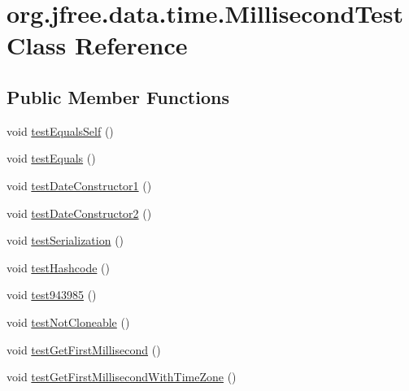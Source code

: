 \hypertarget{classorg_1_1jfree_1_1data_1_1time_1_1_millisecond_test}{}\section{org.\+jfree.\+data.\+time.\+Millisecond\+Test Class Reference}
\label{classorg_1_1jfree_1_1data_1_1time_1_1_millisecond_test}
\subsection*{Public Member Functions}
\begin{DoxyCompactItemize}
\item 
void \mbox{\hyperlink{classorg_1_1jfree_1_1data_1_1time_1_1_millisecond_test_a50713484e4d0f9be25ddb7e6b3e41e4f}{test\+Equals\+Self}} ()
\item 
void \mbox{\hyperlink{classorg_1_1jfree_1_1data_1_1time_1_1_millisecond_test_aeff51a4a9bc0872c56f6621bd3c331b6}{test\+Equals}} ()
\item 
void \mbox{\hyperlink{classorg_1_1jfree_1_1data_1_1time_1_1_millisecond_test_a9d6bd2d8d1970973ecf0a51f7749584a}{test\+Date\+Constructor1}} ()
\item 
void \mbox{\hyperlink{classorg_1_1jfree_1_1data_1_1time_1_1_millisecond_test_af014f7972606608f61926467a07a73cb}{test\+Date\+Constructor2}} ()
\item 
void \mbox{\hyperlink{classorg_1_1jfree_1_1data_1_1time_1_1_millisecond_test_ac260bba0fa2fb5bbe687b30ee4f79dc8}{test\+Serialization}} ()
\item 
void \mbox{\hyperlink{classorg_1_1jfree_1_1data_1_1time_1_1_millisecond_test_a27a0b5c04e4618efb087138b33d3080d}{test\+Hashcode}} ()
\item 
void \mbox{\hyperlink{classorg_1_1jfree_1_1data_1_1time_1_1_millisecond_test_a06791ca82d25dad7b89259387ed7ba94}{test943985}} ()
\item 
void \mbox{\hyperlink{classorg_1_1jfree_1_1data_1_1time_1_1_millisecond_test_a6a323c3fc6fce0b8e84d37a33de78d3c}{test\+Not\+Cloneable}} ()
\item 
void \mbox{\hyperlink{classorg_1_1jfree_1_1data_1_1time_1_1_millisecond_test_a3c532cfe9c7189fe4e460fc5e64f38bc}{test\+Get\+First\+Millisecond}} ()
\item 
void \mbox{\hyperlink{classorg_1_1jfree_1_1data_1_1time_1_1_millisecond_test_ac91ba22c85ec04d5fc296fb8d3e3a703}{test\+Get\+First\+Millisecond\+With\+Time\+Zone}} ()
\item 

\end{DoxyCompactItemize}
